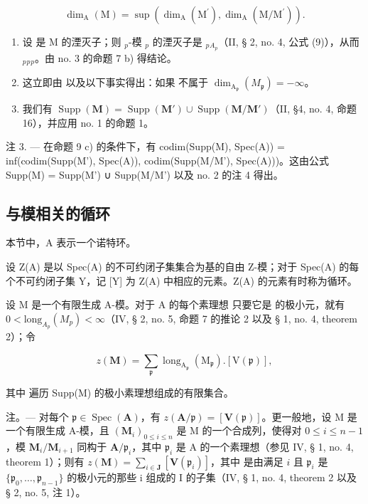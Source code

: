 \[
\dim_ {\mathrm{A}} (\mathrm{M}) = \sup \left(\dim_ {\mathrm{A}} \left(\mathrm{M} ^ {\prime}\right), \dim_ {\mathrm{A}} \left(\mathrm{M} / \mathrm{M} ^ {\prime}\right)\right).
\]

\begin{enumerate}
\def\labelenumi{\alph{enumi})}
\item
  设  是 M 的湮灭子；则 \(_{p}\)-模 \(_{p}\) 的湮灭子是 \(_{p}\)\(_{A_{p}}\)（II, § 2, no. 4, 公式 (9)），从而 \(_{p}\)\(_{p}\)\(_{p}\)。由 no. 3 的命题 7 b) 得结论。
\item
  这立即由  以及以下事实得出：如果  不属于 \(\dim_{\mathrm{A}_{\mathfrak{p}}}(M_{\mathfrak{p}}) = -\infty\)。
\item
  我们有 \(\operatorname{Supp}(\mathbf{M}) = \operatorname{Supp}(\mathbf{M}') \cup \operatorname{Supp}(\mathbf{M} / \mathbf{M}')\)（II, §4, no. 4, 命题 16），并应用 no. 1 的命题 1。
\end{enumerate}

注 3. --- 在命题 9 c) 的条件下，有 codim(Supp(M), Spec(A)) = inf(codim(Supp(M'), Spec(A)), codim(Supp(M/M'), Spec(A)))。这由公式 Supp(M) = Supp(M') ∪ Supp(M/M') 以及 no. 2 的注 4 得出。

\subsection{与模相关的循环}

本节中，A 表示一个诺特环。

{}{}设 Z(A) 是以 Spec(A) 的不可约闭子集集合为基的自由 Z-模；对于 Spec(A) 的每个不可约闭子集 Y，记 [Y] 为 Z(A) 中相应的元素。Z(A) 的元素有时称为循环。

设 M 是一个有限生成 A-模。对于 A 的每个素理想 只要它是  的极小元，就有 \(0 < \text{long}_{A_{p}}(M_{p}) < \infty\)（IV, § 2, no. 5, 命题 7 的推论 2 以及 § 1, no. 4, theorem 2）；令

\[
z (\mathbf {M}) = \sum_ {\mathfrak {p}} \operatorname{long} _ {\mathrm{A} _ {\mathfrak {p}}} (\mathrm{M} _ {\mathfrak {p}}). [ \mathrm{V} (\mathfrak {p}) ],
\]

其中  遍历 Supp(M) 的极小素理想组成的有限集合。

注。--- 对每个 \(\mathfrak{p} \in \operatorname{Spec}(\mathbf{A})\)，有 \(z(\mathbf{A}/\mathfrak{p}) = [\mathbf{V}(\mathfrak{p})]\)。更一般地，设 M 是一个有限生成 A-模，且 \((\mathbf{M}_i)_{0 \leqslant i \leqslant n}\) 是 M 的一个合成列，使得对 \(0 \leqslant i \leqslant n - 1\)，模 \(\mathbf{M}_i / \mathbf{M}_{i+1}\) 同构于 \(\mathbf{A}/\mathfrak{p}_i\)，其中 \(\mathfrak{p}_i\) 是 A 的一个素理想（参见 IV, § 1, no. 4, theorem 1）；则有 \(z(\mathbf{M}) = \sum_{i \in \mathbf{J}} [\mathbf{V}(\mathfrak{p}_i)]\)，其中  是由满足 \(i\) 且 \(\mathfrak{p}_i\) 是 \(\{\mathfrak{p}_0, \ldots, \mathfrak{p}_{n-1}\}\) 的极小元的那些 i 组成的 I 的子集（IV, § 1, no. 4, theorem 2 以及 § 2, no. 5, 注 1）。

